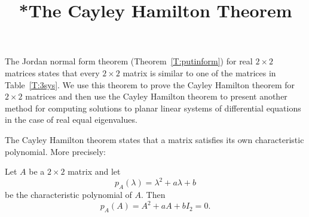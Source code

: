 \documentclass{ximera}
\title{*The Cayley Hamilton Theorem}
\begin{document}
\begin{abstract}
\end{abstract}
\maketitle

\label{S:6.6}

The Jordan normal form theorem (Theorem~\ref{T:putinform}) for real $2\times 2$ matrices states that 
every $2\times 2$ matrix is similar to one of the matrices in Table~\ref{T:3sys}.
We use this theorem to prove the Cayley Hamilton theorem 
 for $2\times 2$ 
matrices and then use the Cayley Hamilton theorem to present another method 
for computing solutions to planar linear systems of differential equations in the 
case of real equal eigenvalues.


The Cayley Hamilton theorem states that a matrix satisfies its own
characteristic polynomial.  More precisely:
\begin{theorem} \label{T:CH2}
Let $A$ be a $2\times 2$ matrix and let
\[
p_A(\lambda) = \lambda^2 + a\lambda + b
\]
be the characteristic polynomial of $A$.  Then
\[
p_A(A) = A^2 + aA + bI_2 = 0.
\]
\end{theorem}
\end{document}
